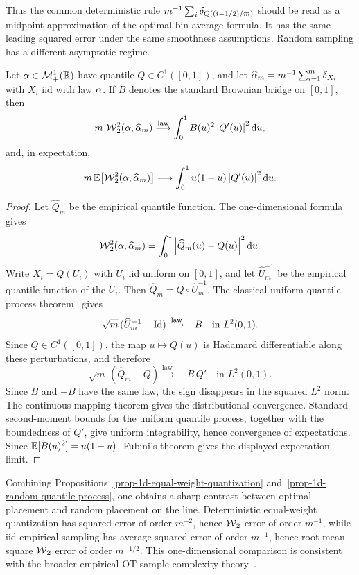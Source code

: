 Thus the common deterministic rule $m^{-1}\sum_i\delta_{Q((i-1/2)/m)}$ should be read as a midpoint approximation of the optimal bin-average formula. It has the same leading squared error under the same smoothness assumptions. Random sampling has a different asymptotic regime.

\begin{prop}\label{prop-1d-random-quantile-process}
	Let $\alpha\in\mathcal{M}_+^1(\mathbb{R})$ have quantile $Q\in C^1([0,1])$, and let $\widehat{\alpha}_m=m^{-1}\sum_{i=1}^m\delta_{X_i}$ with $X_i$ iid with law $\alpha$. If $B$ denotes the standard Brownian bridge on $[0,1]$, then
	\[
		m\,\operatorname{\mathcal{W}}_2^2(\alpha,\widehat{\alpha}_m)
		\overset{\mathrm{law}}{\longrightarrow}
		\int_0^1 B(u)^2\left\lvert Q'(u)\right\rvert^2\mathrm{d} u,
	\]
	and, in expectation,
	\[
		m\,\mathbb{E}\!\left[\operatorname{\mathcal{W}}_2^2(\alpha,\widehat{\alpha}_m)\right]
		\longrightarrow
		\int_0^1 u(1-u)\left\lvert Q'(u)\right\rvert^2\mathrm{d} u.
	\]
\end{prop}
\begin{proof}
	Let $\widehat Q_m$ be the empirical quantile function. The one-dimensional formula gives
	\[
		\operatorname{\mathcal{W}}_2^2(\alpha,\widehat{\alpha}_m)
		=
		\int_0^1\left\lvert\widehat Q_m(u)-Q(u)\right\rvert^2\mathrm{d} u.
	\]
	Write $X_i=Q(U_i)$ with $U_i$ iid uniform on $[0,1]$, and let $\widehat U_m^{-1}$ be the empirical quantile function of the $U_i$. Then $\widehat Q_m=Q\circ \widehat U_m^{-1}$. The classical uniform quantile-process theorem~\cite{vanDerVaartWellner1996} gives
	\[
		\sqrt m\,(\widehat U_m^{-1}-\mathrm{Id})
		\overset{\mathrm{law}}{\longrightarrow}
		-B
		\quad\text{in }L^2(0,1).
	\]
	Since $Q\in C^1([0,1])$, the map $u\mapsto Q(u)$ is Hadamard differentiable along these perturbations, and therefore
	\[
		\sqrt m\,(\widehat Q_m-Q)
		\overset{\mathrm{law}}{\longrightarrow}
		-B\,Q'
		\quad\text{in }L^2(0,1).
	\]
	Since $B$ and $-B$ have the same law, the sign disappears in the squared $L^2$ norm. The continuous mapping theorem gives the distributional convergence. Standard second-moment bounds for the uniform quantile process, together with the boundedness of $Q'$, give uniform integrability, hence convergence of expectations. Since $\mathbb{E}[B(u)^2]=u(1-u)$, Fubini's theorem gives the displayed expectation limit.
\end{proof}

Combining Propositions~\ref{prop-1d-equal-weight-quantization} and~\ref{prop-1d-random-quantile-process}, one obtains a sharp contrast between optimal placement and random placement on the line. Deterministic equal-weight quantization has squared error of order $m^{-2}$, hence $\operatorname{\mathcal{W}}_2$ error of order $m^{-1}$, while iid empirical sampling has average squared error of order $m^{-1}$, hence root-mean-square $\operatorname{\mathcal{W}}_2$ error of order $m^{-1/2}$. This one-dimensional comparison is consistent with the broader empirical OT sample-complexity theory~\cite{dereich2013constructive,fournier2015rate,weed2017sharp}.

